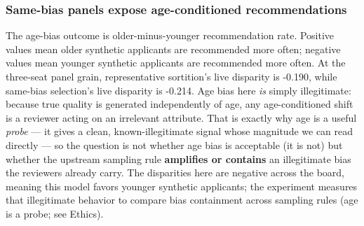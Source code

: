 \documentclass[
]{article}
\begin{document}
\subsubsection{Same-bias panels expose age-conditioned
recommendations}\label{same-bias-panels-expose-age-conditioned-recommendations}

The age-bias outcome is older-minus-younger recommendation rate.
Positive values mean older synthetic applicants are recommended more
often; negative values mean younger synthetic applicants are recommended
more often. At the three-seat panel grain, representative sortition's
live disparity is -0.190, while same-bias selection's live disparity is
-0.214. Age bias here \emph{is} simply illegitimate: because true
quality is generated independently of age, any age-conditioned shift is
a reviewer acting on an irrelevant attribute. That is exactly why age is
a useful \emph{probe} --- it gives a clean, known-illegitimate signal
whose magnitude we can read directly --- so the question is not whether
age bias is acceptable (it is not) but whether the upstream sampling
rule \textbf{amplifies or contains} an illegitimate bias the reviewers
already carry. The disparities here are negative across the board,
meaning this model favors younger synthetic applicants; the experiment
measures that illegitimate behavior to compare bias containment across
sampling rules (age is a probe; see Ethics).
\end{document}
